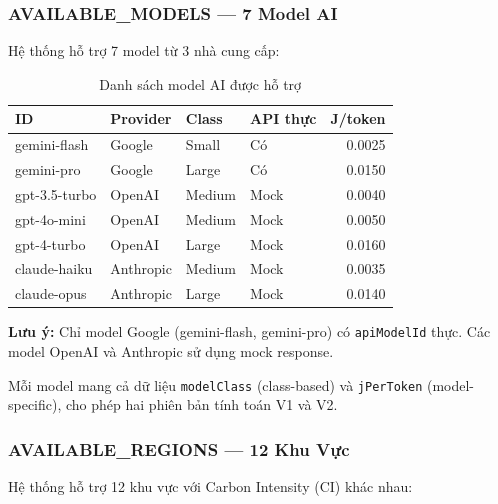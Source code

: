 \documentclass[12pt,a4paper]{article}
\begin{document}
\subsubsection{AVAILABLE\_MODELS — 7 Model AI}

Hệ thống hỗ trợ 7 model từ 3 nhà cung cấp:

\begin{table}[h]
    \centering
    \begin{tabular}{llllr}
        \toprule
        \textbf{ID} & \textbf{Provider} & \textbf{Class} & \textbf{API thực} & \textbf{J/token} \\
        \midrule
        gemini-flash   & Google    & Small  & Có  & 0.0025 \\
        gemini-pro     & Google    & Large  & Có  & 0.0150 \\
        gpt-3.5-turbo  & OpenAI   & Medium & Mock & 0.0040 \\
        gpt-4o-mini    & OpenAI   & Medium & Mock & 0.0050 \\
        gpt-4-turbo    & OpenAI   & Large  & Mock & 0.0160 \\
        claude-haiku   & Anthropic & Medium & Mock & 0.0035 \\
        claude-opus    & Anthropic & Large  & Mock & 0.0140 \\
        \bottomrule
    \end{tabular}
    \caption{Danh sách model AI được hỗ trợ}
\end{table}

\textbf{Lưu ý:} Chỉ model Google (gemini-flash, gemini-pro) có \texttt{apiModelId} thực. Các model OpenAI và Anthropic sử dụng mock response.

Mỗi model mang cả dữ liệu \texttt{modelClass} (class-based) và \texttt{jPerToken} (model-specific), cho phép hai phiên bản tính toán V1 và V2.

\subsubsection{AVAILABLE\_REGIONS — 12 Khu Vực}

Hệ thống hỗ trợ 12 khu vực với Carbon Intensity (CI) khác nhau:
\end{document}
